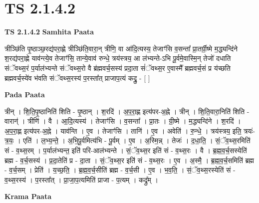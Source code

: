 \documentclass[17pt]{extarticle}
\begin{document}
\section*{ TS 2.1.4.2 }

\textbf{TS 2.1.4.2 } \newline
\textbf{Samhita Paata} \newline

त्रीञ्छि॑ति पृ॒ष्ठाञ्छ॒रद्य॑परा॒ह्णे त्रीञ्छि॑ति॒वारा॒न् त्रीणि॒ वा आ॑दि॒त्यस्य॒ तेजाꣳ॑सि व॒सन्ता᳚ प्रा॒तर्ग्री॒ष्मे म॒द्ध्यन्दि॑ने श॒रद्य॑परा॒ह्णे याव॑न्त्ये॒व तेजाꣳ॑सि॒ तान्ये॒वाव॑ रुन्धे॒ त्रय॑स्त्रय॒ आ ल॑भ्यन्ते-ऽभि पू॒र्वमे॒वास्मि॒न् तेजो॑ दधाति संॅवथ्स॒रं प॒र्याल॑भ्यन्ते संॅवथ्स॒रो वै ब्र॑ह्मवर्च॒सस्य॑ प्रदा॒ता सं॑ॅवथ्स॒र ए॒वास्मै᳚ ब्रह्मवर्च॒सं प्र य॑च्छति ब्रह्मवर्च॒स्ये॑व भ॑वति संॅवथ्स॒रस्य॑ प॒रस्ता᳚त् प्राजाप॒त्यं कद्रु॒ - [  ] \newline

\textbf{Pada Paata} \newline

त्रीन् । शि॒ति॒पृ॒ष्ठानिति॑ शिति - पृ॒ष्ठान् । श॒रदि॑ । अ॒प॒रा॒ह्ण इत्य॑पर-अ॒ह्ने । त्रीन् । शि॒ति॒वारा॒निति॑ शिति - वारान्॑ । त्रीणि॑ । वै । आ॒दि॒त्यस्य॑ । तेजाꣳ॑सि । व॒सन्ता᳚ । प्रा॒तः । ग्री॒ष्मे । म॒द्ध्यन्दि॑ने । श॒रदि॑ । अ॒प॒रा॒ह्ण इत्य॑पर-अ॒ह्ने । याव॑न्ति । ए॒व । तेजाꣳ॑सि । तानि॑ । ए॒व । अवेति॑ । रु॒न्धे॒ । त्रय॑स्त्रय॒ इति॒ त्रयः॑-त्र॒यः॒ । एति॑ । ल॒भ्य॒न्ते॒ । अ॒भि॒पू॒र्वमित्य॑भि - पू॒र्वम् । ए॒व । अ॒स्मि॒न्न् । तेजः॑ । द॒धा॒ति॒ । सं॒ॅव॒थ्स॒रमिति॑ सं - व॒थ्स॒रम् । प॒र्याल॑भ्यन्त॒ इति॑ परि-आल॑भ्यन्ते । सं॒ॅव॒थ्स॒र इति॑ सं - व॒थ्स॒रः । वै । ब्र॒ह्म॒व॒र्च॒सस्येति॑ ब्रह्म - व॒र्च॒सस्य॑ । प्र॒दा॒तेति॑ प्र - दा॒ता । सं॒ॅव॒थ्स॒र इति॑ सं - व॒थ्स॒रः । ए॒व । अ॒स्मै॒ । ब्र॒ह्म॒व॒र्च॒समिति॑ ब्रह्म - व॒र्च॒सम् । प्रेति॑ । य॒च्छ॒ति॒ । ब्र॒ह्म॒व॒र्च॒सीति॑ ब्रह्म - व॒र्च॒सी । ए॒व । भ॒व॒ति॒ । सं॒ॅव॒थ्स॒रस्येति॑ सं - व॒थ्स॒रस्य॑ । प॒रस्ता᳚त् । प्रा॒जा॒प॒त्यमिति॑ प्राजा - प॒त्यम् । कद्रु᳚म् ।  \newline


\textbf{Krama Paata} \newline
\end{document}
